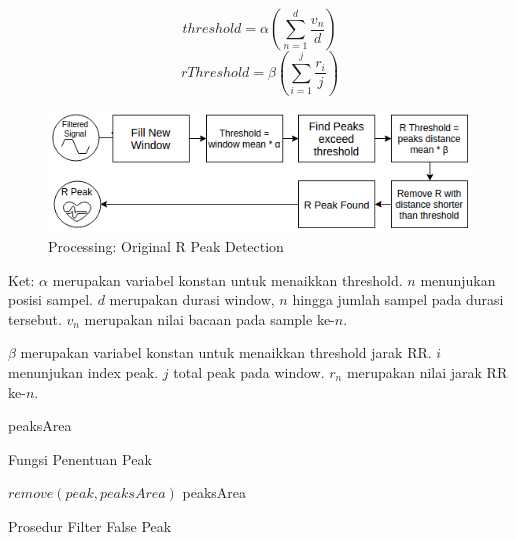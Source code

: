 \begin{equation}
threshold = \alpha (\sum_{n=1}^{d} \frac{v_{n}}{d})
\label{eq:threshold} 
\end{equation}
\begin{equation}
rThreshold = \beta (\sum_{i=1}^{j} \frac{r_{i}}{j})
\label{eq:r_threshold} 
\end{equation}

\begin{figure}[htbp]
\centerline{\includegraphics[scale=0.65]{images/processing_modif.png}}
\caption{Processing: Original R Peak Detection}
\label{fig:processing_modif}
\end{figure}

Ket:
$\alpha$ merupakan variabel konstan untuk menaikkan threshold. $n$ menunjukan posisi sampel. $d$ merupakan durasi window, $n$ hingga jumlah sampel pada durasi tersebut. $v_{n}$ merupakan nilai bacaan pada sample ke-$n$.

$\beta$ merupakan variabel konstan untuk menaikkan threshold jarak RR. $i$ menunjukan index peak. $j$ total peak pada window. $r_{n}$ merupakan nilai jarak RR ke-$n$.

\begin{algorithm}[H]
 \begin{algorithmic}[1]
   	\State {}
	   			\State {}
				\State {}
				\State {}
				\State {}
				\State {}
				\State {}	
			\EndIf
	   	\Else
	   		\State {}
   		\EndIf
	\EndFor	
	\State \Return peaksArea
	\EndFunction
 \end{algorithmic}
 \caption{Fungsi Penentuan Peak}\label{Algo:peaksFind}
\end{algorithm} 

\begin{algorithm}[H]
 \begin{algorithmic}[1]
	\State {}
   	   	 
	   		\State $remove(peak, peaksArea)$ 
   		\EndIf
	\EndFor	
	\State \Return peaksArea
	\EndFunction
 \end{algorithmic}
 \caption{Prosedur Filter False Peak}\label{Algo:peaksRemove}
\end{algorithm}

